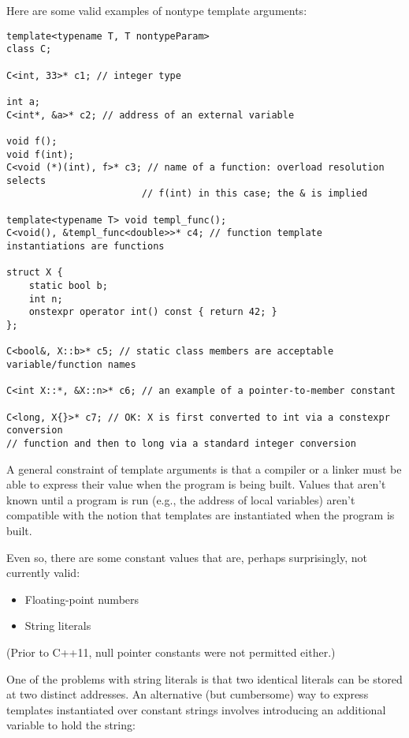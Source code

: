 Here are some valid examples of nontype template arguments:

\begin{lstlisting}[style=styleCXX]
template<typename T, T nontypeParam>
class C;

C<int, 33>* c1; // integer type

int a;
C<int*, &a>* c2; // address of an external variable

void f();
void f(int);
C<void (*)(int), f>* c3; // name of a function: overload resolution selects
						// f(int) in this case; the & is implied

template<typename T> void templ_func();
C<void(), &templ_func<double>>* c4; // function template instantiations are functions

struct X {
	static bool b;
	int n;
	onstexpr operator int() const { return 42; }
};

C<bool&, X::b>* c5; // static class members are acceptable variable/function names

C<int X::*, &X::n>* c6; // an example of a pointer-to-member constant

C<long, X{}>* c7; // OK: X is first converted to int via a constexpr conversion
// function and then to long via a standard integer conversion
\end{lstlisting}

A general constraint of template arguments is that a compiler or a linker must be able to express their value when the program is being built. Values that aren’t known until a program is run (e.g., the address of local variables) aren’t compatible with the notion that templates are instantiated when the program is built.

Even so, there are some constant values that are, perhaps surprisingly, not currently valid:

\begin{itemize}
\item 
Floating-point numbers

\item 
String literals
\end{itemize}

(Prior to C++11, null pointer constants were not permitted either.)

One of the problems with string literals is that two identical literals can be stored at two distinct addresses. An alternative (but cumbersome) way to express templates instantiated over constant strings involves introducing an additional variable to hold the string:

